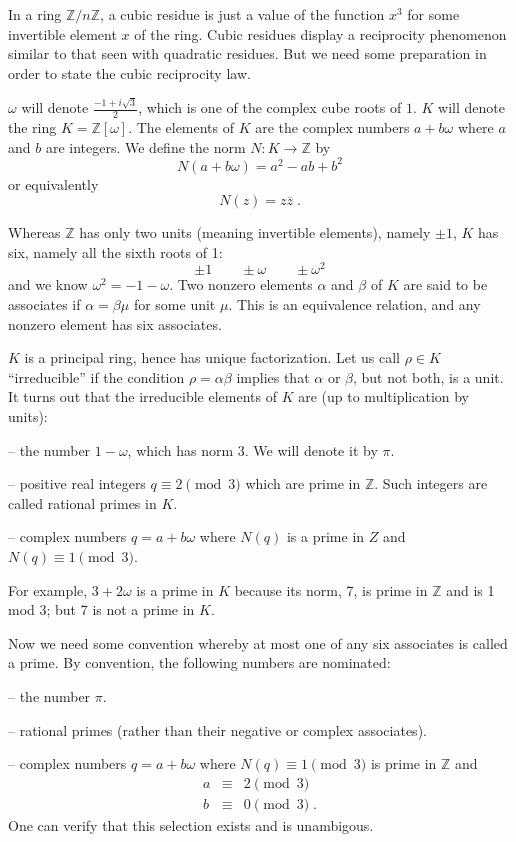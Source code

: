 \documentclass[12pt]{article}
\newcommand{\Z}{\mathbb{Z}}
\begin{document}
In a ring $\Z/n\Z$, a cubic residue is just a value of the function
$x^3$ for some invertible element $x$ of the ring. Cubic residues display
a reciprocity phenomenon similar to that seen with quadratic
residues. But we need some preparation in order to state the cubic
reciprocity law.

$\omega$ will denote $\frac{-1+i\sqrt{3}}{2}$, which is one of the
complex cube roots of $1$.
$K$ will denote the ring $K=\mathbb{Z}[\omega]$. The elements of
$K$ are the complex numbers $a+b\omega$
where $a$ and $b$ are integers. We define the norm $N:K\to \Z$ by
$$N(a+b\omega)=a^2-ab+b^2$$
or equivalently
$$N(z)=z\overline{z}\;.$$

Whereas $\Z$ has only two units (meaning invertible elements), namely
$\pm 1$, $K$ has six, namely all the sixth roots of 1:
$$\pm 1\qquad\pm\omega\qquad\pm\omega^2$$
and we know $\omega^2=-1-\omega$. Two nonzero elements $\alpha$
and $\beta$ of $K$ are said
to be associates if $\alpha=\beta\mu$ for some unit $\mu$. This
is an equivalence relation, and any nonzero element has six associates.

$K$ is a principal ring, hence has unique factorization. Let us call
$\rho\in K$ ``irreducible'' if the condition $\rho=\alpha\beta$ implies
that $\alpha$ or $\beta$, but not both, is a unit.
It turns out that the irreducible elements of $K$ are (up to multiplication
by units):

-- the number $1-\omega$, which has norm 3. We will denote it by $\pi$.

-- positive real integers $q\equiv 2\pmod{3}$ which are prime in $\Z$.
Such integers are called rational primes in $K$.

-- complex numbers $q=a+b\omega$ where $N(q)$ is a prime in $Z$ and
$N(q)\equiv 1\pmod{3}$.

For example, $3+2\omega$ is a prime in $K$ because its norm, 7, is
prime in $\Z$ and is 1 mod 3; but 7 is not a prime in $K$.

Now we need some convention whereby at most one of any six associates
is called a prime. By convention, the following numbers are nominated:

-- the number $\pi$.

-- rational primes (rather than their negative or complex associates).

-- complex numbers $q=a+b\omega$ where $N(q)\equiv 1\pmod{3}$ is
prime in $\Z$ and
\begin{eqnarray*}
a&\equiv& 2\pmod{3} \\
b&\equiv& 0\pmod{3}\;.
\end{eqnarray*}
One can verify that this selection exists and is unambigous.
\end{document}
